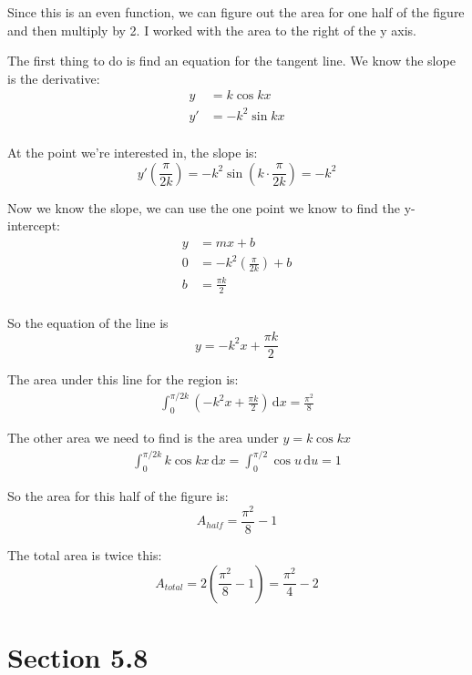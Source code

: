 \documentclass{exam}
\begin{document}
\begin{solution}
Since this is an even function, we can figure out the area for one half of the figure and then multiply by 2.  I worked
with the area to the right of the y axis.

The first thing to do is find an equation for the tangent line.  We know the slope is the derivative:
\begin{align*}
  y &= k \cos kx \\
  y' &= -k^2 \sin kx \\
\end{align*}

At the point we're interested in, the slope is:
\[
  y' \left( \frac{\pi}{2k} \right) = -k^2 \sin \left(k \cdot \frac{\pi}{2k} \right) = -k^2
\]

Now we know the slope, we can use the one point we know to find the y-intercept:
\begin{align*}
  y &= mx + b \\
  0 &= -k^2 \left(\frac{\pi}{2k} \right) + b \\
  b &= \frac{\pi k}{2} \\
\end{align*}

So the equation of the line is
\[
  y = -k^2x + \frac{\pi k}{2}
\]

The area under this line for the region is:
\begin{align*}
  \int_0^{\pi/2k} \left( -k^2x + \frac{\pi k}{2} \right) \, \mathrm{d}x = \frac{\pi^2}{8}
\end{align*}

The other area we need to find is the area under $y = k \cos kx$
\begin{align*}
  \int_0^{\pi/2k} k \cos kx \, \mathrm{d}x = \int_0^{\pi/2} \cos u \, \mathrm{d}u = 1
\end{align*}

So the area for this half of the figure is:
\[
  A_{half} = \frac{\pi^2}{8} - 1
\]

The total area is twice this:
\[
  A_{total} = 2 \left( \frac{\pi^2}{8} - 1 \right) = \frac{\pi^2}{4} - 2
\]


\end{solution}

\ifprintanswers

\section{Section 5.8}
\end{document}
